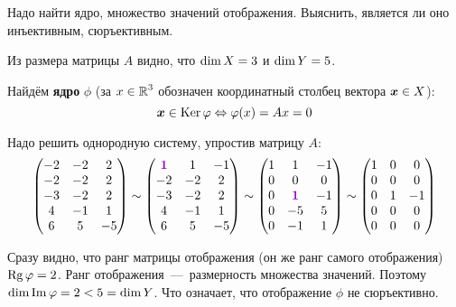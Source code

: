 \documentclass[a4paper,12pt]{article}
\DeclareMathOperator{\Imag}{Im}
\begin{document}
  Надо найти ядро, множество значений отображения.
  Выяснить, является ли оно инъективным, сюръективным.
  
  \begin{solution}
    Из размера матрицы $A$ видно, что $\dim X \hm= 3$ и $\dim Y \hm= 5$.
    
    Найдём \textbf{ядро} $\phi$ (за $x \hm\in \RR^3$ обозначен координатный столбец вектора $\boldsymbol x \in X$):
    \[
      \boldsymbol x \in \operatorname{Ker}\varphi \Leftrightarrow \varphi(x) = Ax = 0
    \]
    
    Надо решить однородную систему, упростив матрицу $A$:
    \begin{equation}\label{p-23-29-gauss}
      \begin{pmatrix}
        -2 & -2 & 2\\
        -2 & -2 & 2\\
        -3 & -2 & 2\\
        4 & -1 & 1\\
        6 & 5 & -5
      \end{pmatrix}
      \sim \begin{pmatrix}
        \textcolor{violet}{\bds 1} & 1 & -1\\
        -2 & -2 & 2\\
        -3 & -2 & 2\\
        4 & -1 & 1\\
        6 & 5 & -5
      \end{pmatrix}
      \sim \begin{pmatrix}
        1 & 1 & -1\\
        0 & 0 & 0\\
        0 & \textcolor{violet}{\bds 1} & -1\\
        0 & -5 & 5\\
        0 & -1 & 1
      \end{pmatrix}
      \sim \begin{pmatrix}
        1 & 0 & 0\\
        0 & 0 & 0\\
        0 & 1 & -1\\
        0 & 0 & 0\\
        0 & 0 & 0
      \end{pmatrix}
    \end{equation}
    
    Сразу видно, что ранг матрицы отображения (он же ранг самого отображения) $\Rg\phi \hm= 2$.
    Ранг отображения~---~размерность множества значений.
    Поэтому $\dim\Imag\phi \hm= 2 \hm< 5 \hm= \dim Y$.
    Что означает, что отображение $\phi$ не сюръективно.
    

\end{solution}
\end{document}

